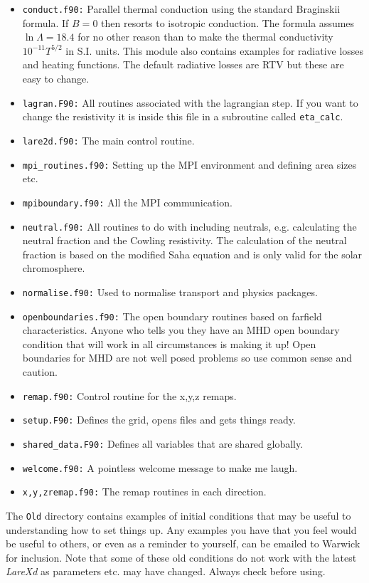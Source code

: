 \documentclass[11pt]{article}
\begin{document}
\begin{itemize}
  \item{\texttt{conduct.f90:}} Parallel thermal conduction using the standard Braginskii formula. If $B=0$ then 
  resorts to isotropic conduction. The formula assumes $\ln\Lambda=18.4$ for no other reason than to make the 
  thermal conductivity $10^{-11}T^{5/2}$ in S.I. units. This module also contains examples for radiative losses 
  and heating functions. The default radiative losses are RTV but these are easy to change.
  \item{\texttt{lagran.F90:}} All routines associated with the lagrangian step. If you want to change the 
  resistivity it is inside this file in a subroutine called \texttt{eta\_calc}.
  \item{\texttt{lare2d.f90:}} The main control routine.
  \item{\texttt{mpi\_routines.f90:}} Setting up the MPI environment and defining area sizes etc.
  \item{\texttt{mpiboundary.f90:}} All the MPI communication.
  \item{\texttt{neutral.f90:}} All routines to do with including neutrals, e.g. calculating the neutral fraction and 
  the Cowling resistivity. The calculation of the neutral fraction is based on the modified Saha equation and is only 
  valid for the solar chromosphere.
  \item{\texttt{normalise.f90:}} Used to normalise transport and physics packages.
  \item{\texttt{openboundaries.f90:}} The open boundary routines based on farfield characteristics. Anyone who tells 
  you they have an MHD open boundary condition that will work in all circumstances is making it up! Open boundaries 
  for MHD are not well posed problems so use common sense and caution.
  \item{\texttt{remap.f90:}} Control routine for the x,y,z remaps.
  \item{\texttt{setup.F90:}} Defines the grid, opens files and gets things ready.
  \item{\texttt{shared\_data.F90:}} Defines all variables that are shared globally.
  \item{\texttt{welcome.f90:}} A pointless welcome message to make me laugh.
  \item{\texttt{x,y,zremap.f90:}} The remap routines in each direction.
\end{itemize}

The \texttt{Old} directory contains examples of initial conditions that may be useful to understanding how to set 
things up. Any examples you have that you feel would be useful to others, or even as a reminder to yourself, can 
be emailed to Warwick for inclusion. Note that some of these old conditions do not work with the latest {\it LareXd} 
as parameters etc. may have changed. Always check before using.
\end{document}
